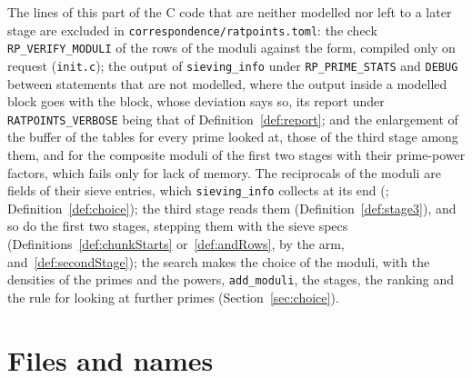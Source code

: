 The lines of this part of the C code that are neither modelled nor left to a later stage are
excluded in \verb|correspondence/ratpoints.toml|: the check \verb|RP_VERIFY_MODULI| of the rows of
the moduli against the form, compiled only on request (\verb|init.c|); the output of
\verb|sieving_info| under \verb|RP_PRIME_STATS| and \verb|DEBUG| between statements that are not
modelled, where the output inside a modelled block goes with the block, whose deviation says so, its
report under \verb|RATPOINTS_VERBOSE| being that of Definition~\ref{def:report}; and the enlargement
of the buffer of the tables for every prime looked at, those of the third stage among them, and for
the composite moduli of the first two stages with their prime-power factors, which fails only for
lack of memory. The reciprocals of the moduli are fields of their sieve entries, which
\verb|sieving_info| collects at its end (;
Definition~\ref{def:choice}); the third stage reads them (Definition~\ref{def:stage3}), and so do
the first two stages, stepping them with the sieve specs (Definitions~\ref{def:chunkStarts}
or~\ref{def:andRows}, by the arm, and~\ref{def:secondStage}); the search makes the choice of the
moduli, with the densities of the primes and the powers, \verb|add_moduli|, the stages, the ranking
and the rule for looking at further primes (Section~\ref{sec:choice}).

\section{Files and names}\label{sec:tablesFiles}

